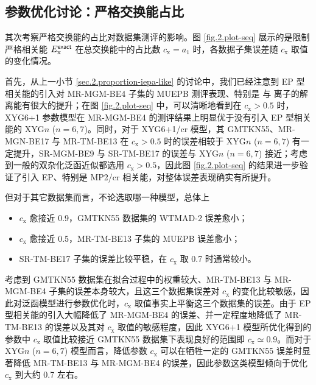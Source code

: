 \subsection{参数优化讨论：严格交换能占比}
\label{sec.2.proportion-exchange}

其次考察严格交换能的占比对数据集测评的影响。图 \ref{fig.2.plot-seq} 展示的是限制严格相关能 $E_\mathrm{x}^{\textsf{exact}}$ 在总交换能中的占比数 $c_\mathrm{x} = a_1$ 时，各数据子集误差随 $c_\mathrm{x}$ 取值的变化情况。

首先，从上一小节 \ref{sec.2.proportion-iepa-like} 的讨论中，我们已经注意到 EP 型相关能的引入对 MR-MGM-BE4 子集的 MUEPB 测评表现、特别是  与  离子的解离能有很大的提升；在图 \ref{fig.2.plot-seq} 中，可以清晰地看到在 $c_\mathrm{x} > 0.5$ 时，XYG6+1 参数模型在 MR-MGM-BE4 的测评结果上明显优于没有引入 EP 型相关能的 XYG$n$ ($n=6,7$)。同时，对于 XYG6+1/cr 模型，其 GMTKN55、MR-MGN-BE17 与 MR-TM-BE13 在 $c_\mathrm{x} > 0.5$ 时的误差相较于 XYG$n$ ($n=6,7$) 有一定提升，SR-MGM-BE9 与 SR-TM-BE17 的误差与 XYG$n$ ($n=6,7$) 接近；考虑到一般的双杂化泛函近似都选用 $c_\mathrm{x} > 0.5$，因此图 \ref{fig.2.plot-seq} 的结果进一步验证了引入 EP、特别是 MP2/cr 相关能，对整体误差表现确实有所提升。

但对于其它数据集而言，不论选取哪一种模型，总体上
\begin{itemize}[nosep]
  \item $c_\mathrm{x}$ 愈接近 0.9，GMTKN55 数据集的 WTMAD-2 误差愈小；
  \item $c_\mathrm{x}$ 愈接近 0.5，MR-TM-BE13 子集的 MUEPB 误差愈小；
  \item SR-TM-BE17 子集的误差比较平稳，在 $c_\mathrm{x}$ 取 0.7 时通常较小。
\end{itemize}
考虑到 GMTKN55 数据集在拟合过程中的权重较大、MR-TM-BE13 与 MR-MGM-BE4 子集的误差本身较大，且这三个数据集误差对 $c_\mathrm{x}$ 的变化比较敏感，因此对泛函模型进行参数优化时，$c_\mathrm{x}$ 取值事实上平衡这三个数据集的误差。由于 EP 型相关能的引入大幅降低了 MR-MGM-BE4 的误差、并一定程度地降低了 MR-TM-BE13 的误差以及其对 $c_\mathrm{x}$ 取值的敏感程度，因此 XYG6+1 模型所优化得到的参数中 $c_\mathrm{x}$ 取值比较接近 GMTKN55 数据集下表现良好的范围即 $c_\mathrm{x} \simeq 0.9$。而对于 XYG$n$ ($n=6,7$) 模型而言，降低参数 $c_\mathrm{x}$ 可以在牺牲一定的 GMTKN55 误差时显著降低 MR-TM-BE13 与 MR-MGM-BE4 的误差，因此参数这类模型倾向于优化 $c_\mathrm{x}$ 到大约 0.7 左右。

